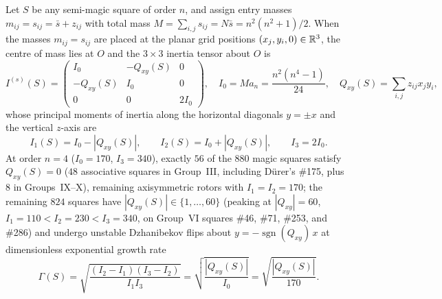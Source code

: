 \begin{theorem}
\label{thm:quadrupole-split}
Let $S$ be any semi-magic square of order $n$, and assign entry masses $m_{ij}=s_{ij}=\bar s+z_{ij}$ with total mass $M=\sum_{i,j}s_{ij}=N\bar s=n^2(n^2+1)/2$. When the masses $m_{ij}=s_{ij}$ are placed at the planar grid positions $(x_j,y_i,0)\in\mathbb{R}^3$, the centre of mass lies at $O$ and the $3\times3$ inertia tensor about $O$ is
\begin{equation}
\label{eq:inertia-entry}
I^{(s)}(S) = \begin{pmatrix}
I_0 & -Q_{xy}(S) & 0\\
-Q_{xy}(S) & I_0 & 0\\
0 & 0 & 2I_0
\end{pmatrix},\quad
I_0 = M a_n = \frac{n^2(n^4-1)}{24},\quad
Q_{xy}(S) = \sum_{i,j}z_{ij}x_jy_i,
\end{equation}
whose principal moments of inertia along the horizontal diagonals $y=\pm x$ and the vertical $z$-axis are
\begin{equation}
\label{eq:principal-entry}
I_1(S) = I_0 - |Q_{xy}(S)|,\qquad
I_2(S) = I_0 + |Q_{xy}(S)|,\qquad
I_3 = 2I_0.
\end{equation}
At order $n=4$ ($I_0=170$, $I_3=340$), exactly $56$ of the $880$ magic squares satisfy $Q_{xy}(S)=0$ ($48$ associative squares in Group~III, including D\"urer's \#175, plus $8$ in Groups~IX--X), remaining axisymmetric rotors with $I_1=I_2=170$; the remaining $824$ squares have $|Q_{xy}(S)|\in\{1,\dots,60\}$ (peaking at $|Q_{xy}|=60$, $I_1=110 < I_2=230 < I_3=340$, on Group~VI squares \#46, \#71, \#253, and \#286) and undergo unstable Dzhanibekov flips about $y=-\operatorname{sgn}(Q_{xy})\,x$ at dimensionless exponential growth rate
\[
\Gamma(S) = \sqrt{\frac{(I_2-I_1)(I_3-I_2)}{I_1 I_3}} = \sqrt{\frac{|Q_{xy}(S)|}{I_0}} = \sqrt{\frac{|Q_{xy}(S)|}{170}}.
\]


\end{theorem}
